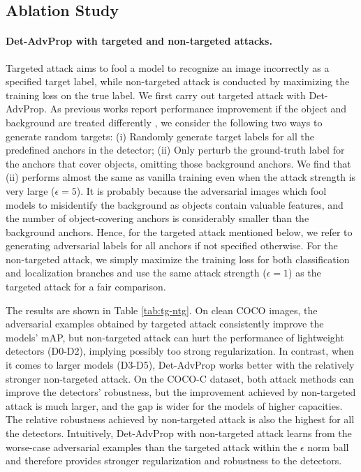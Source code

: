 \documentclass[final]{cvpr}
\begin{document}
\subsection{Ablation Study}
\label{sec:ablation}
\paragraph{Det-AdvProp with targeted and non-targeted attacks.}
Targeted attack aims to fool a model to recognize an image incorrectly as a specified target label, while non-targeted attack is conducted by maximizing the training loss on the true label.
We first carry out targeted attack with Det-AdvProp.
As previous works report performance improvement if the object and background are treated differently \cite{zoph2019learning}, we consider the following two ways to generate random targets:
(i) Randomly generate target labels for all the predefined anchors in the detector; (ii) Only perturb the ground-truth label for the anchors that cover objects, omitting those background anchors.
We find that (ii) performs almost the same as vanilla training even when the attack strength is very large ($\epsilon=5$).
It is probably because the adversarial images which fool models to misidentify the background as objects contain valuable features, and the number of object-covering anchors is considerably smaller than the background anchors.
Hence, for the targeted attack mentioned below, we refer to generating adversarial labels for all anchors if not specified otherwise.
For the non-targeted attack, we simply maximize the training loss for both classification and localization branches and use the same attack strength ($\epsilon=1$) as the targeted attack for a fair comparison.

The results are shown in Table \ref{tab:tg-ntg}.
On clean COCO images, the adversarial examples obtained by targeted attack consistently improve the models' mAP, but non-targeted attack can hurt the performance of lightweight detectors (D0-D2), implying possibly too strong regularization.
In contrast, when it comes to larger models (D3-D5), Det-AdvProp works better with the relatively stronger non-targeted attack.
On the COCO-C dataset, both attack methods can improve the detectors' robustness, but the improvement achieved by non-targeted attack is much larger, and the gap is wider for the models of higher capacities.
The relative robustness achieved by non-targeted attack is also the highest for all the detectors.
Intuitively, Det-AdvProp with non-targeted attack learns from the worse-case adversarial examples than the targeted attack within the $\epsilon$ norm ball and therefore provides stronger regularization and robustness to the detectors.
\end{document}
